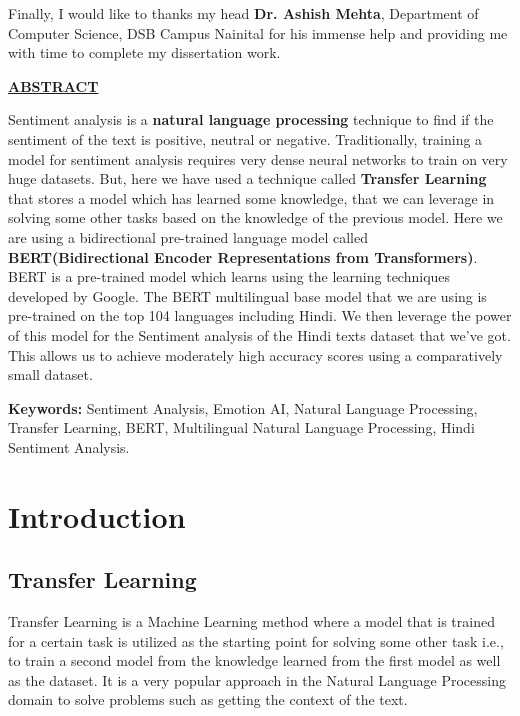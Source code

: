 \documentclass[a4paper, 12pt]{article}
\begin{document}
\begin{sloppypar}
Finally, I would like to thanks my head \textbf{Dr. Ashish Mehta}, Department of Computer Science, DSB Campus Nainital for his immense help and providing me with time to complete my dissertation work.
\thispagestyle{empty}
\clearpage


\begin{center}
\textbf{\underline{ABSTRACT}} \\ [0.5ex]
\end{center}
 Sentiment analysis is a \textbf{natural language processing} technique to find if the sentiment of the text is positive, neutral or negative. Traditionally, training a model for sentiment analysis requires very dense neural networks to train on very huge datasets. But, here we have used a technique called \textbf{Transfer Learning} that stores a model which has learned some knowledge, that we can leverage in solving some other tasks based on the knowledge of the previous model. Here we are using a bidirectional pre-trained language model called  \textbf{BERT(Bidirectional Encoder Representations from Transformers)}. BERT is a pre-trained model which learns using the learning techniques developed by Google. The BERT multilingual base model that we are using is pre-trained on the top 104 languages including Hindi. We then leverage the power of this model for the Sentiment analysis of the Hindi texts dataset that we've got. This allows us to achieve moderately high accuracy scores using a comparatively small dataset.

\textbf{Keywords:} Sentiment Analysis, Emotion AI,  Natural Language Processing, Transfer Learning, BERT, Multilingual Natural Language Processing, Hindi Sentiment Analysis.
\thispagestyle{empty}
\clearpage
\tableofcontents
\thispagestyle{empty}
\clearpage
\listoffigures
\listoftables
\thispagestyle{empty}
\clearpage
\setcounter{page}{1}
\section{Introduction}

\subsection{Transfer Learning}
Transfer Learning is a Machine Learning method where a model that is trained for a certain task is utilized as the starting point for solving some other task i.e., to train a second model from the knowledge learned from the first model as well as the dataset. It is a very popular approach in the Natural Language Processing domain to solve problems such as getting the context of the text.


\end{sloppypar}
\end{document}

